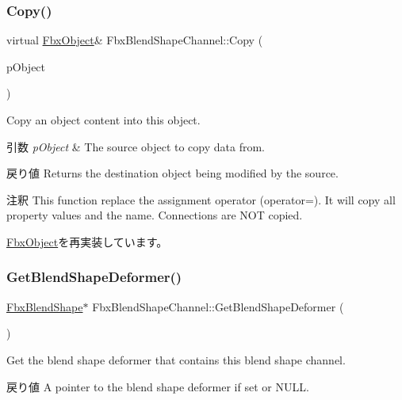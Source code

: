 \subsubsection{\texorpdfstring{Copy()}{Copy()}}
{\footnotesize\ttfamily virtual \hyperlink{class_fbx_object}{Fbx\+Object}\& Fbx\+Blend\+Shape\+Channel\+::\+Copy (\begin{DoxyParamCaption}\item[{const \hyperlink{class_fbx_object}{Fbx\+Object} \&}]{p\+Object }\end{DoxyParamCaption})\hspace{0.3cm}{\ttfamily [virtual]}}

Copy an object content into this object. 
\begin{DoxyParams}{引数}
{\em p\+Object} & The source object to copy data from. \\
\hline
\end{DoxyParams}
\begin{DoxyReturn}{戻り値}
Returns the destination object being modified by the source. 
\end{DoxyReturn}
\begin{DoxyRemark}{注釈}
This function replace the assignment operator (operator=). It will copy all property values and the name. Connections are N\+OT copied. 
\end{DoxyRemark}


\hyperlink{class_fbx_object_a0c0c5adb38284d14bb82c04d54504a3e}{Fbx\+Object}を再実装しています。

\mbox{\label{class_fbx_blend_shape_channel_aa79b43cdb62a8dc5bbafad03acbf4425}} 
\subsubsection{\texorpdfstring{Get\+Blend\+Shape\+Deformer()}{GetBlendShapeDeformer()}}
{\footnotesize\ttfamily \hyperlink{class_fbx_blend_shape}{Fbx\+Blend\+Shape}$\ast$ Fbx\+Blend\+Shape\+Channel\+::\+Get\+Blend\+Shape\+Deformer (\begin{DoxyParamCaption}{ }\end{DoxyParamCaption})}

Get the blend shape deformer that contains this blend shape channel. \begin{DoxyReturn}{戻り値}
A pointer to the blend shape deformer if set or N\+U\+LL. 
\end{DoxyReturn}
\mbox{\label{class_fbx_blend_shape_channel_a1dba13e481ea7ba1874587ad92ee0347}} 
